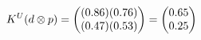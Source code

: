 \documentclass[preview]{standalone}
\begin{document}
\begin{align*}
\special{dvisvgm:raw <g id='unique000'>}K^U(d \otimes p) = \begin{pmatrix} (0.86)(0.76) \\ (0.47)(0.53) \end{pmatrix} = \begin{pmatrix} 0.65 \\ 0.25 \end{pmatrix}\special{dvisvgm:raw </g>}
\end{align*}
\end{document}

